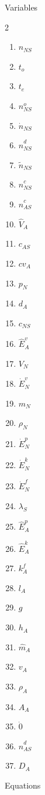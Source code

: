 \documentclass[10pt,a4paper]{report}
\begin{document}
	\Large{Variables}
	
	\begin{multicols}{2}
		\begin{enumerate}
			\item $n_{NS}$
			\item $t_o$
			\item $t_e$
			\item $n^{o}_{NS}$
			\item $\dot{n}_{NS}$
			\item $\hat{n}^{d}_{NS}$
			\item $\tilde{n}_{NS}$
			\item $\hat{n}^{c}_{NS}$
			\item $\hat{n}^{c}_{AS}$
			\item $\hat{V}_{A}$
			\item $c_{AS}$
			\item $cv_A$
			\item $p_N$
			\item $d_A$
			\item $c_{NS}$
			\item $\hat{E}^{v}_{A}$
			\item $V_N$
			\item $\dot{E}^{v}_N$
			\item $m_N$
			\item $\rho_N$
			\item $\dot{E}^{p}_N$
			\item $\dot{E}^{k}_N$
			\item $\dot{E}^{f}_N$
			\item $\lambda_S$
			\item $\hat{E}^{p}_{A}$
			\item $\hat{E}^{k}_{A}$
			\item $k^{f}_A$
			\item $l_A$
			\item $g$
			\item $h_A$
			\item $\hat{m}_A$
			\item $v_A$
			\item $\rho_A$
			\item $A_A$
			\item $\dot{0}$
			\item $\hat{n}^{d}_{AS}$
			\item $D_A$ 
		\end{enumerate}
	\end{multicols}	
	\newpage
	\Large{Equations}
\end{document}
